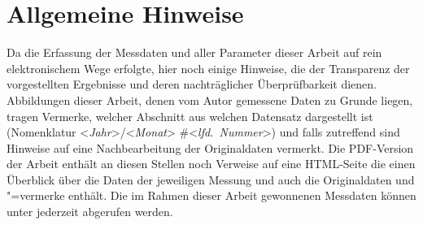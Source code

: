 \section*{Allgemeine Hinweise}
Da die Erfassung der Messdaten und aller Parameter dieser Arbeit auf rein elektronischem Wege erfolgte, hier noch einige Hinweise, die der Transparenz der vorgestellten Ergebnisse und deren nachträglicher Überprüfbarkeit dienen. 
Abbildungen dieser Arbeit, denen vom Autor gemessene Daten zu Grunde liegen, tragen Vermerke, welcher Abschnitt aus welchen Datensatz dargestellt ist (Nomenklatur <{\itshape Jahr}>/<{\itshape Monat}> \#<{\itshape lfd.\ Nummer}>) und falls zutreffend sind Hinweise auf eine Nachbearbeitung der Originaldaten vermerkt. Die PDF-Version der Arbeit enthält an diesen Stellen noch Verweise auf eine HTML-Seite die einen Überblick über die Daten der jeweiligen Messung und auch die Originaldaten und "=vermerke enthält. Die im Rahmen dieser Arbeit gewonnenen Messdaten können unter  jederzeit abgerufen werden.
